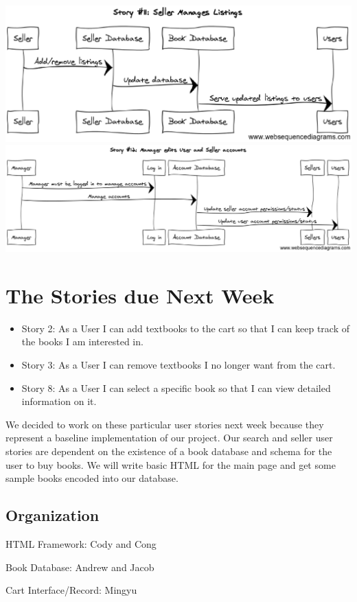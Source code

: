 \documentclass[12pt]{article}
\begin{document}
 		\par
 		\vspace{5cm}
 		\includegraphics[width=16cm]{story11.eps}
 		\clearpage
 		\includegraphics[width=16cm]{story12.eps}

	\section{The Stories due Next Week}
		\begin{itemize}
		\item Story 2: As a User I can add textbooks to the cart so that I can keep track of the books I am interested in.

		\item Story 3: As a User I can remove textbooks I no longer want from the cart.

		\item Story 8: As a User I can select a specific book so that I can view detailed information on it.
		\end{itemize}
		We decided to work on these particular user stories next week because they represent a baseline implementation of our project. 
		Our search and seller user stories are dependent on the existence of a book database and schema for the user to buy books. 
		We will write basic HTML for the main page and get some sample books encoded into our database.
		\subsection{Organization}
		HTML Framework: Cody and Cong \par
		Book Database: Andrew and Jacob \par
		Cart Interface/Record: Mingyu \par
\end{document}
